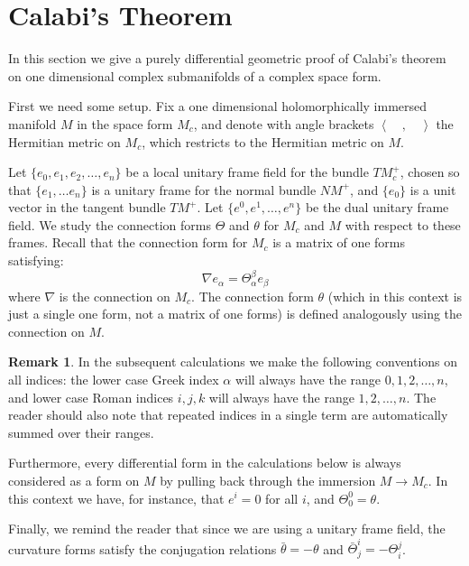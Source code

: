 \documentclass[11pt]{amsart}
\theoremstyle{definition}
\newtheorem{remark}{Remark}
\theoremstyle{definition}
\def \la { \left\langle }
\def \ra { \right\rangle }
\def \TMp{ TM^{+} }
\def \NMp{ NM^+ }
\begin{document}
\parskip 6pt
\parindent 0pt
\baselineskip 14pt

\section{Calabi's Theorem}

In this section we give a purely differential geometric proof of Calabi's theorem on one dimensional complex submanifolds of a complex space form. 

First we need some setup.  Fix a one dimensional holomorphically immersed manifold $M$ in the space form $M_c$, and denote with angle brackets $\la \quad , \quad \ra$ the Hermitian metric on $M_c$, which restricts to the Hermitian metric on $M$.

Let $\{e_0, e_1, e_2, \ldots , e_n\}$ be a local unitary frame field for the bundle $TM_c^{+}$, chosen so that $\{e_1, \ldots e_n\}$ is a unitary frame for the normal bundle $\NMp$, and $\{ e_0 \}$ is a unit vector in the tangent bundle $\TMp$.  Let $\{e^0, e^1, \ldots, e^n\}$ be the dual unitary frame field.  We study the connection forms $\Theta$ and $\theta$ for $M_c$ and $M$ with respect to these frames. Recall that the connection form for $M_c$ is a matrix of one forms satisfying:
%
$$ \nabla e_\alpha = \Theta^{\beta}_{\alpha} e_{\beta} $$
%
where $\nabla$ is the connection on $M_c$.  The connection form $\theta$ (which in this context is just a single one form, not a matrix of one forms) is defined analogously using the connection on $M$.  

\begin{remark} 
%
In the subsequent calculations we make the following conventions on all indices: the lower case Greek index $\alpha$ will always have the range $0,1,2,\ldots,n$, and lower case Roman indices $i,j,k$ will always have the range $1,2,\ldots,n$.  The reader should also note that repeated indices in a single term are automatically summed over their ranges. 

Furthermore, every differential form in the calculations below is always considered as a form on $M$ by pulling back through the immersion $M \rightarrow M_c$.  In this context we have, for instance, that $e^i = 0$ for all $i$, and $\Theta^0_0 = \theta$.  

Finally, we remind the reader that since we are using a unitary frame field, the curvature forms satisfy the conjugation relations $\bar{\theta} = - \theta$ and $\bar{\Theta}^i_j = - \Theta^j_i$.
%
\end{remark}
\end{document}
